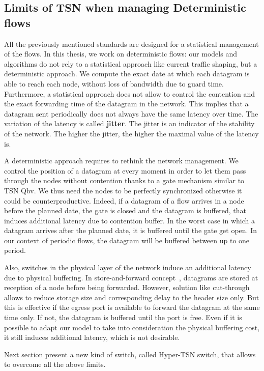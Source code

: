 \subsection{Limits of TSN when managing Deterministic flows}

All the previously mentioned standards are designed for a statistical management of the flows. In this thesis, we work on deterministic flows: our models and algorithms do not rely to a statistical approach like current traffic shaping, but a deterministic approach. We compute the exact date at which each datagram is able to reach each node, without loss of bandwidth due to guard time. Furthermore, a statistical approach does not allow to control the contention and the exact forwarding time of the datagram in the network. This implies that a datagram sent periodically does not always have the same latency over time. The variation of the latency is called \textbf{jitter}. The jitter is an indicator of the stability of the network. The higher the jitter, the higher the maximal value of the latency is.

A deterministic approach requires to rethink the network management. We control the position of a datagram at every moment in order to let them pass through the nodes without contention thanks to a gate mechanism similar to TSN Qbv. We thus need the nodes to be perfectly synchronized otherwise it could be counterproductive. Indeed, if a datagram of a flow arrives in a node before the planned date, the gate is closed and the datagram is buffered, that induces additional latency due to contention buffer. In the worst case in which a datagram arrives after the planned date, it is buffered until the gate get open. In our context of periodic flows, the datagram will be buffered between up to one period.

Also, switches in the physical layer of the network induce an additional latency due to physical buffering. In store-and-forward concept~\cite{tindell1992store}, datagrams are stored at reception of a node before being forwarded. However, solution like cut-through~\cite{kermani1979virtual} allows to reduce storage size and corresponding delay to the header size only. But this is effective if the egress port is available to forward the datagram at the same time only. If not, the datagram is buffered until the port is free. Even if it is possible to adapt our model to take into consideration the physical buffering cost, it still induces additional latency, which is not desirable.

Next section present a new kind of switch, called Hyper-TSN switch, that allows to overcome all the above limits.

